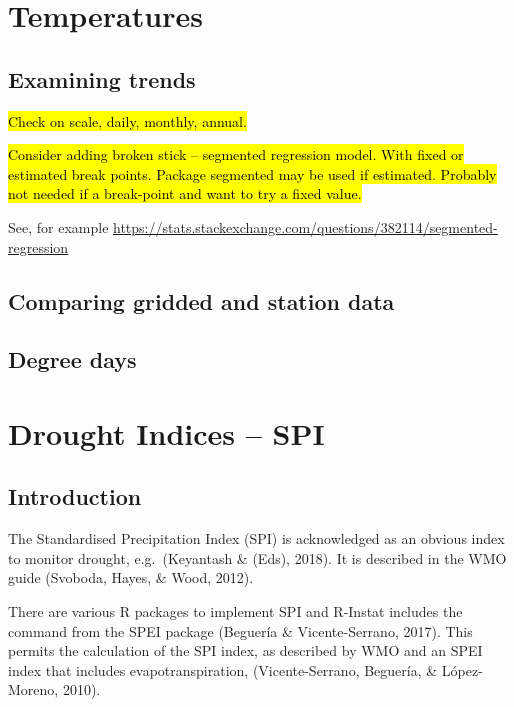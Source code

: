 \documentclass[
  letterpaper,
  DIV=11,
  numbers=noendperiod]{scrreprt}
\begin{document}

\chapter{Temperatures}\label{temperatures}

\section{Examining trends}\label{examining-trends}

\hl{Check on scale, daily, monthly, annual.}

\hl{Consider adding broken stick -- segmented regression model. With
fixed or estimated break points. Package segmented may be used if
estimated. Probably not needed if a break-point and want to try a fixed
value.}

See, for example
\href{https://stats.stackexchange.com/questions/382114/segmented-regression}{\ul{https://stats.stackexchange.com/questions/382114/segmented-regression}}

\section{Comparing gridded and station
data}\label{comparing-gridded-and-station-data}

\section{Degree days}\label{degree-days}


\chapter{Drought Indices -- SPI}\label{drought-indices-spi}

\section{Introduction}\label{introduction-14}

The Standardised Precipitation Index (SPI) is acknowledged as an obvious
index to monitor drought, e.g.~(Keyantash \& (Eds), 2018). It is
described in the WMO guide (Svoboda, Hayes, \& Wood, 2012).

There are various R packages to implement SPI and R-Instat includes the
command from the SPEI package (Beguería \& Vicente-Serrano, 2017). This
permits the calculation of the SPI index, as described by WMO and an
SPEI index that includes evapotranspiration, (Vicente-Serrano, Beguería,
\& López-Moreno, 2010).
\end{document}
